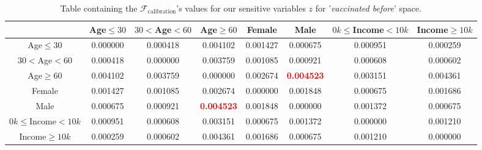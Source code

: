\documentclass{article}
\begin{document}
\begin{center}
\begin{table}[H]
\begin{adjustbox}{max width=\textwidth}
    \begin{tabular}{ |c| c c c c c c c|}
    \hline
      & Age$\leq30$ &    $30<$Age$<60$ &     Age$\geq60$ &    Female &      Male &   $0k\leq$Income$<10k$ &    Income$\geq10k$  \\
    \hline
     Age$\leq30$ &  0.000000 &  0.000418 &  0.004102 &  0.001427 &  0.000675 &  0.000951 &  0.000259 \\
    \hline
    $30<$Age$<60$ &  0.000418 &  0.000000 &  0.003759 &  0.001085 &  0.000921 &  0.000608 &  0.000602 \\
    \hline
    Age$\geq60$ &  0.004102 &  0.003759 &  0.000000 &  0.002674 &  \textbf{\textcolor{red}{0.004523}} &  0.003151 &  0.004361 \\
    \hline
    Female &  0.001427 &  0.001085 &  0.002674 &  0.000000 &  0.001848 &  0.000675 &  0.001686 \\
    \hline
    Male &  0.000675 &  0.000921 &  \textbf{\textcolor{red}{0.004523}} &  0.001848 &  0.000000 &  0.001372 &  0.000675 \\
    \hline
    $0k\leq$Income$<10k$ &  0.000951 &  0.000608 &  0.003151 &  0.000675 &  0.001372 &  0.000000 &  0.001210 \\
    \hline
    Income$\geq10k$ &  0.000259 &  0.000602 &  0.004361 &  0.001686 &  0.000675 &  0.001210 &  0.000000
    \\ \hline
    \end{tabular}
    \end{adjustbox}
\caption{Table containing the $\mathcal{F}_{\text{calibration}}$'s values for our sensitive variables $z$ for '\textit{vaccinated before}' space.}
\label{tab:16}
\end{table}
\end{center}
\end{document}
